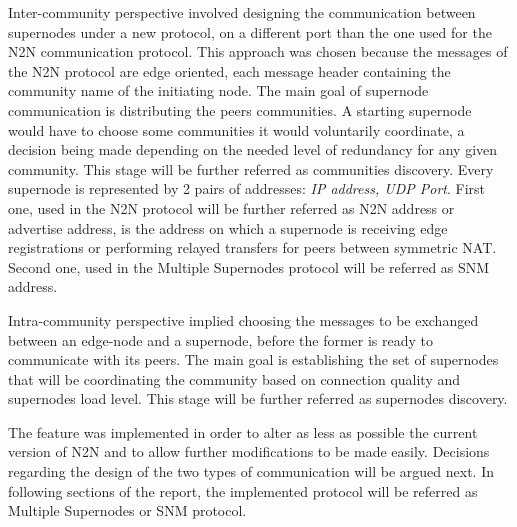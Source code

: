 Inter-community perspective involved designing the communication between supernodes under a new protocol, on a different port than the one used for the N2N communication protocol. This approach was chosen because the messages of the N2N protocol are edge oriented, each message header containing the community name of the initiating node. The main goal of supernode communication is distributing the peers communities. A starting supernode would have to choose some communities it would voluntarily coordinate, a decision being made depending on the needed level of redundancy for any given community. This stage will be further referred as communities discovery. Every supernode is represented by 2 pairs of addresses: \emph{IP address, UDP Port}. First one, used in the N2N protocol will be further referred as N2N address or advertise address, is the address on which a supernode is receiving edge registrations or performing relayed transfers for peers between symmetric NAT. Second one, used in the Multiple Supernodes protocol will be referred as SNM address.

Intra-community perspective implied choosing the messages to be exchanged between an edge-node and a supernode, before the former is ready to communicate with its peers. The main goal is establishing the set of supernodes that will be coordinating the community based on connection quality and supernodes load level. This stage will be further referred as supernodes discovery.

The feature was implemented \cite{git_repo} in order to alter as less as possible the current version of N2N and to allow further modifications to be made easily. Decisions regarding the design of the two types of communication will be argued next. In following sections of the report, the implemented protocol will be referred as Multiple Supernodes or SNM protocol. 
